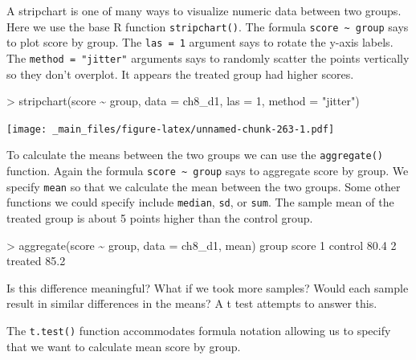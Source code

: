 \documentclass[
]{book}
\newenvironment{Shaded}{\begin{snugshade}}{\end{snugshade}}
\newcommand{\AttributeTok}[1]{\textcolor[rgb]{0.77,0.63,0.00}{#1}}
\newcommand{\DecValTok}[1]{\textcolor[rgb]{0.00,0.00,0.81}{#1}}
\newcommand{\FloatTok}[1]{\textcolor[rgb]{0.00,0.00,0.81}{#1}}
\newcommand{\FunctionTok}[1]{\textcolor[rgb]{0.00,0.00,0.00}{#1}}
\newcommand{\NormalTok}[1]{#1}
\newcommand{\SpecialCharTok}[1]{\textcolor[rgb]{0.00,0.00,0.00}{#1}}
\newcommand{\StringTok}[1]{\textcolor[rgb]{0.31,0.60,0.02}{#1}}
\begin{document}
A stripchart is one of many ways to visualize numeric data between two groups. Here we use the base R function \texttt{stripchart()}. The formula \texttt{score\ \textasciitilde{}\ group} says to plot score by group. The \texttt{las\ =\ 1} argument says to rotate the y-axis labels. The \texttt{method\ =\ "jitter"} arguments says to randomly scatter the points vertically so they don't overplot. It appears the treated group had higher scores.

\begin{Shaded}
\begin{Highlighting}[]
\SpecialCharTok{\textgreater{}} \FunctionTok{stripchart}\NormalTok{(score }\SpecialCharTok{\textasciitilde{}}\NormalTok{ group, }\AttributeTok{data =}\NormalTok{ ch8\_d1, }\AttributeTok{las =} \DecValTok{1}\NormalTok{, }\AttributeTok{method =} \StringTok{"jitter"}\NormalTok{)}
\end{Highlighting}
\end{Shaded}

\texttt{[image: \_main\_files/figure-latex/unnamed-chunk-263-1.pdf]}

To calculate the means between the two groups we can use the \texttt{aggregate()} function. Again the formula \texttt{score\ \textasciitilde{}\ group} says to aggregate score by group. We specify \texttt{mean} so that we calculate the mean between the two groups. Some other functions we could specify include \texttt{median}, \texttt{sd}, or \texttt{sum}. The sample mean of the treated group is about 5 points higher than the control group.

\begin{Shaded}
\begin{Highlighting}[]
\SpecialCharTok{\textgreater{}} \FunctionTok{aggregate}\NormalTok{(score }\SpecialCharTok{\textasciitilde{}}\NormalTok{ group, }\AttributeTok{data =}\NormalTok{ ch8\_d1, mean)}
\NormalTok{    group score}
\DecValTok{1}\NormalTok{ control  }\FloatTok{80.4}
\DecValTok{2}\NormalTok{ treated  }\FloatTok{85.2}
\end{Highlighting}
\end{Shaded}

Is this difference meaningful? What if we took more samples? Would each sample result in similar differences in the means? A t test attempts to answer this.

The \texttt{t.test()} function accommodates formula notation allowing us to specify that we want to calculate mean score by group.
\end{document}
